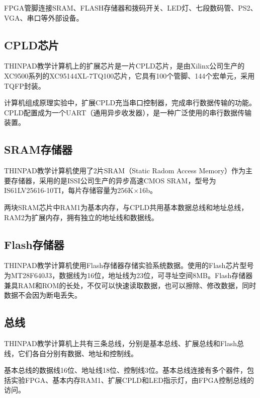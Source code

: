 FPGA管脚连接SRAM、FLASH存储器和拨码开关、LED灯、七段数码管、PS2、VGA、串口等外部设备。


\subsection{CPLD芯片}
THINPAD教学计算机上的扩展芯片是一片CPLD芯片，是由Xilinx公司生产的XC9500系列的XC95144XL-7TQ100芯片，它具有100个管脚、144个宏单元，采用TQFP封装。

计算机组成原理实验中，扩展CPLD充当串口控制器，完成串行数据传输的功能。CPLD配置成为一个UART（通用异步收发器），是一种广泛使用的串行数据传输装置。


\subsection{SRAM存储器}
THINPAD教学计算机使用了2片SRAM（Static Radom Access Memory）作为主要存储器，采用的是ISSI公司生产的异步高速CMOS SRAM，型号为IS61LV25616-10TI，每片存储容量为256K$\times$16b。

两块SRAM芯片中RAM1为基本内存，与CPLD共用基本数据总线和地址总线，RAM2为扩展内存，拥有独立的地址线和数据线。


\subsection{Flash存储器}
THINPAD教学计算机使用Flash存储器存储实验系统数据。使用的Flash芯片型号为MT28F640J3，数据线为16位，地址线为23位，可寻址空间8MB。Flash存储器兼具RAM和ROM的长处，不仅可以快速读取数据，也可以擦除、修改数据，同时数据不会因为断电丢失。


\subsection{总线}
THINPAD教学计算机上共有三条总线，分别是基本总线、扩展总线和Flash总线，它们各自分别有数据、地址和控制线。

基本总线的数据线16位、地址线18位、控制线3位。基本总线连接有多个器件，包括实验FPGA、基本内存RAM1、扩展CPLD和LED指示灯，由FPGA控制总线的访问。

